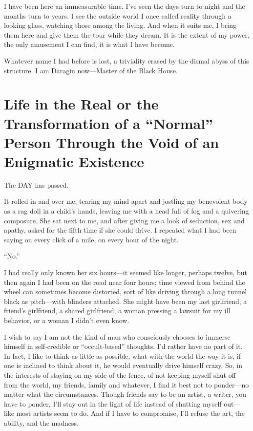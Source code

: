 I have been here an immeasurable time. I've seen the days turn to night
and the months turn to years. I see the outside world I once called
reality through a looking glass, watching those among the living. And
when it suits me, I bring them here and give them the tour while they
dream. It is the extent of my power, the only amusement I can find, it
is what I have become.

Whatever name I had before is lost, a triviality erased by the dismal
abyss of this structure. I am Daragin now---Master of the Black House.

\chapter{Life in the Real or the Transformation of a ``Normal'' Person
Through the Void of an Enigmatic
Existence}\label{life-in-the-real-or-the-transformation-of-a-normal-person-through-the-void-of-an-enigmatic-existence}

The DAY has passed.

It rolled in and over me, tearing my mind apart and jostling my
benevolent body as a rag doll in a child's hands, leaving me with a head
full of fog and a quivering composure. She sat next to me, and after
giving me a look of seduction, sex and apathy, asked for the fifth time
if she could drive. I repeated what I had been saying on every click of
a mile, on every hour of the night.

``No.''

I had really only known her six hours---it seemed like longer, perhaps
twelve, but then again I had been on the road near four hours; time
viewed from behind the wheel can sometimes become distorted, sort of
like driving through a long tunnel black as pitch---with blinders
attached. She might have been my last girlfriend, a friend's girlfriend,
a shared girlfriend, a woman pressing a lawsuit for my ill behavior, or
a woman I didn't even know.

I wish to say I am not the kind of man who consciously chooses to
immerse himself in self-credible or ``occult-based'' thoughts. I'd
rather have no part of it. In fact, I like to think as little as
possible, what with the world the way it is, if one is inclined to think
about it, he would eventually drive himself crazy. So, in the interests
of staying on my side of the fence, of not keeping myself shut off from
the world, my friends, family and whatever, I find it best not to
ponder---no matter what the circumstances. Though friends say to be an
artist, a writer, you have to ponder, I'll stay out in the light of life
instead of shutting myself out---like most artists seem to do. And if I
have to compromise, I'll refuse the art, the ability, and the madness.

